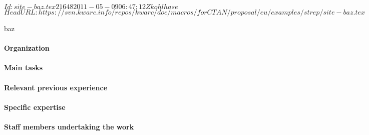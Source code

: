 \svnInfo $Id: site-baz.tex 21648 2011-05-09 06:47:12Z kohlhase $
\svnKeyword $HeadURL: https://svn.kwarc.info/repos/kwarc/doc/macros/forCTAN/proposal/eu/examples/strep/site-baz.tex $
\begin{sitedescription}{baz}
\paragraph{Organization}
\paragraph{Main tasks}
\paragraph{Relevant previous experience}
\paragraph{Specific expertise}
\paragraph{Staff members undertaking the work}
\end{sitedescription}

